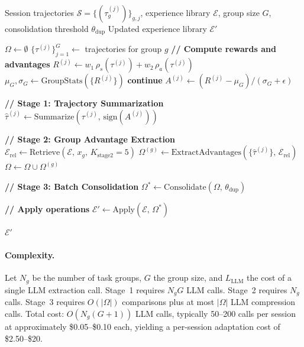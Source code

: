 \begin{algorithm}[H]
\caption{AGENT-GRPO: Agent-Level Training-Free GRPO}
\label{alg:agent-grpo}
\begin{algorithmic}[1]
\Require Session trajectories $\mathcal{S} = \{(\tau^{(j)}_g)\}_{g,j}$,
         experience library $\mathcal{E}$,
         group size $G$, consolidation threshold $\theta_{\text{dup}}$
\Ensure Updated experience library $\mathcal{E}'$

\State $\Omega \gets \emptyset$ 
    \State $\{\tau^{(j)}\}_{j=1}^G \gets$ trajectories for group $g$
    \State \textbf{// Compute rewards and advantages}
        \State $R^{(j)} \gets w_1\,\rho_s(\tau^{(j)}) + w_2\,\rho_a(\tau^{(j)})$
    \EndFor
    \State $\mu_G, \sigma_G \gets \text{GroupStats}(\{R^{(j)}\})$
        \State \textbf{continue} 
    \EndIf
        \State $A^{(j)} \gets (R^{(j)} - \mu_G) / (\sigma_G + \epsilon)$
    \EndFor

    \State \textbf{// Stage 1: Trajectory Summarization}
        \State $\hat{\tau}^{(j)} \gets \text{Summarize}(\tau^{(j)},\, \text{sign}(A^{(j)}))$
    \EndFor

    \State \textbf{// Stage 2: Group Advantage Extraction}
    \State $\mathcal{E}_{\text{rel}} \gets \text{Retrieve}(\mathcal{E},\, x_g,\, K_{\text{stage2}}=5)$
    \State $\Omega^{(g)} \gets \text{ExtractAdvantages}(\{\hat{\tau}^{(j)}\},\, \mathcal{E}_{\text{rel}})$
    \State $\Omega \gets \Omega \cup \Omega^{(g)}$
\EndFor

\State \textbf{// Stage 3: Batch Consolidation}
\State $\Omega^* \gets \text{Consolidate}(\Omega,\, \theta_{\text{dup}})$

\State \textbf{// Apply operations}
\State $\mathcal{E}' \gets \text{Apply}(\mathcal{E},\, \Omega^*)$

\State \Return $\mathcal{E}'$
\end{algorithmic}
\end{algorithm}

\paragraph{Complexity.}
Let $N_g$ be the number of task groups, $G$ the group size, and $L_{\text{LLM}}$
the cost of a single LLM extraction call. Stage~1 requires $N_g G$ LLM calls.
Stage~2 requires $N_g$ calls. Stage~3 requires $O(|\Omega|)$ comparisons plus
at most $|\Omega|$ LLM compression calls. Total cost: $O(N_g(G + 1))$ LLM
calls, typically 50--200 calls per session at approximately \$0.05--\$0.10
each, yielding a per-session adaptation cost of \$2.50--\$20.

